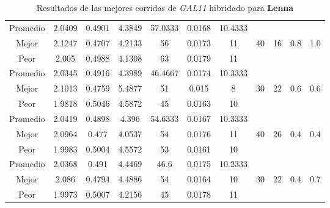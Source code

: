 \begin{table}[h!]
\begin{center}
\begin{tabular}{|c|c|c|c|c|c|c|c|c|c|c|}
        \hline
        \hline
            Promedio  & 2.0409 & 0.4901 & 4.3849 & 57.0333 & 0.0168 & 10.4333 &  &  &  & \\
            \cline{1-7}
            Mejor & 2.1247 & 0.4707  & 4.2133 & 56 & 0.0173 & 11 & 40 & 16 & 0.8 & 1.0\\
            \cline{1-7}
            Peor & 2.005 & 0.4988  & 4.1308 & 63 & 0.0179 & 11 &  &  &  & \\
        \hline
        \hline
            Promedio  & 2.0345 & 0.4916 & 4.3989 & 46.4667 & 0.0174 & 10.3333 &  &  &  & \\
            \cline{1-7}
            Mejor & 2.1013 & 0.4759  & 5.4877 & 51 & 0.015 & 8 & 30 & 22 & 0.6 & 0.6\\
            \cline{1-7}
            Peor & 1.9818 & 0.5046  & 4.5872 & 45 & 0.0163 & 10 &  &  &  & \\
        \hline
        \hline
            Promedio  & 2.0419 & 0.4898 & 4.396 & 54.6333 & 0.0167 & 10.3333 &  &  &  & \\
            \cline{1-7}
            Mejor & 2.0964 & 0.477  & 4.0537 & 54 & 0.0176 & 11 & 40 & 26 & 0.4 & 0.4\\
            \cline{1-7}
            Peor & 1.9983 & 0.5004  & 4.5572 & 53 & 0.0161 & 10 &  &  &  & \\
        \hline
        \hline
            Promedio  & 2.0368 & 0.491 & 4.4469 & 46.6 & 0.0175 & 10.2333 &  &  &  & \\
            \cline{1-7}
            Mejor & 2.086 & 0.4794  & 4.4886 & 54 & 0.0164 & 10 & 30 & 22 & 0.4 & 0.7\\
            \cline{1-7}
            Peor & 1.9973 & 0.5007  & 4.2156 & 45 & 0.0178 & 11 &  &  &  & \\
        \hline
        \end{tabular}
        \caption{Resultados de las mejores corridas de \emph{GAL11} hibridado para {\bf Lenna}}
        \label{tb:tableGAL11}
    \end{center}
\end{table}
